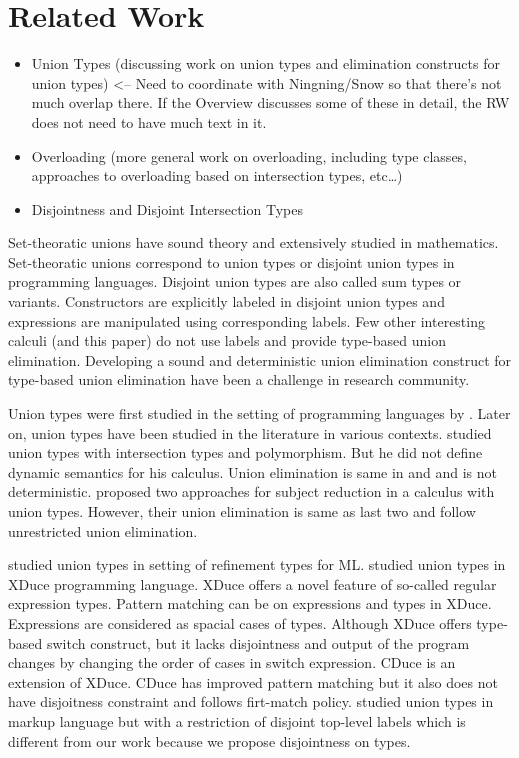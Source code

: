 \section{Related Work}
\label{sec:related}

\begin{itemize}
	\item {Union Types    (discussing work on union types and elimination constructs for union types) <-- Need to coordinate with Ningning/Snow so that there’s not much overlap there. If the Overview discusses some of these in detail, the RW does not need to have much text in it.}
	\item {Overloading (more general work on overloading, including type classes, approaches to overloading based on intersection types, etc…)}
	\item{Disjointness and Disjoint Intersection Types}
\end{itemize}

\noindent Set-theoratic unions have
sound theory and extensively studied in mathematics. Set-theoratic unions correspond to union types
or disjoint union types in programming languages. Disjoint union types are also called sum types or variants.
Constructors are explicitly labeled in disjoint union types and expressions are manipulated using
corresponding labels. Few other interesting calculi (and this paper) do not use labels and provide type-based
union elimination. Developing a sound and deterministic union elimination construct
for type-based union elimination have been a challenge in research community.

Union types were first studied in the setting of programming languages by 
\citet{macqueen1984ideal}. Later on, union types have been studied in
the literature in various contexts. \citep{pierce1991programming} studied union types with intersection
types and polymorphism. But he did not define dynamic semantics for his calculus. Union elimination is same
in \citep{macqueen1984ideal} and \citep{pierce1991programming} and is not deterministic.
\citet{barbanera1995intersection} proposed two approaches for subject reduction in a calculus with
union types. However, their union elimination is same as last two and follow unrestricted union
elimination.

\citet{freeman1991refinement} studied union types in setting of refinement types for ML.
\citet{hosoya2003xduce} studied union types in XDuce programming language. XDuce offers a novel feature
of so-called regular expression types. Pattern matching can be on expressions and types in XDuce.
Expressions are considered as spacial cases of types. Although XDuce offers type-based switch
construct, but it lacks disjointness and output of the program changes by changing the order of
cases in switch expression. CDuce \cite{benzaken2003cduce} is an extension of XDuce. CDuce has
improved pattern matching but it also does not have disjoitness constraint and follows firt-match policy. 
\citet{fallside2001xml} studied union types in markup language but with a restriction of
disjoint top-level labels which is different from our work because we propose disjointness on types.


